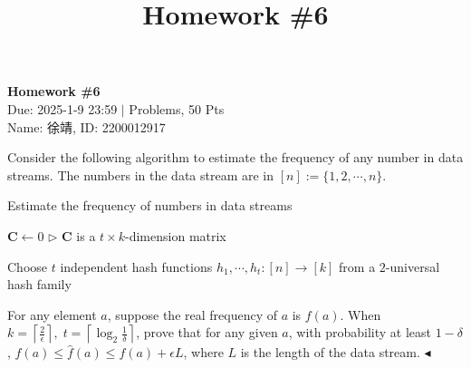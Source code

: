 \documentclass[11pt]{article}
\title{Homework \#6}
\newenvironment{problem}[2][Problem]{\begin{trivlist}
\item[\hskip \labelsep {\bfseries #1}\hskip \labelsep {\bfseries #2.}]}{\hfill$\blacktriangleleft$\end{trivlist}}
\begin{document}
\pagestyle{fancy}
\chead{}

\begin{center}
    {\LARGE \bf Homework \#6}\\
    {Due: 2025-1-9 23:59 \quad$|$ Problems, 50 Pts}\\
    {Name: 徐靖, ID: 2200012917}            %
\end{center}



\begin{problem}{1 (14')} 
Consider the following algorithm to estimate the frequency of any number in data streams. The numbers in the data stream are in $[n]:=\{1,2,\cdots,n\}$. 

\begin{algorithm}[htbp]
    \caption{Estimate the frequency of numbers in data streams}
    $\bm C\gets 0$ \hfill{$\triangleright$ $\bm C$ is a $t\times k$-dimension matrix}

    Choose $t$ independent hash functions $h_1,\cdots,h_t:[n]\to[k]$ from a $2$-universal hash family


\end{algorithm}

For any element $a$, suppose the real frequency of $a$ is $f(a)$. When $k=\left\lceil\frac{2}{\epsilon}\right\rceil,\;t=\left\lceil\log_2 \frac{1}{\delta}\right\rceil$, prove that for any given $a$, with probability at least $1-\delta$, $f(a)\leq\hat f(a)\leq f(a)+\epsilon L$, where $L$ is the length of the data stream. 
\end{problem}
\end{document}
